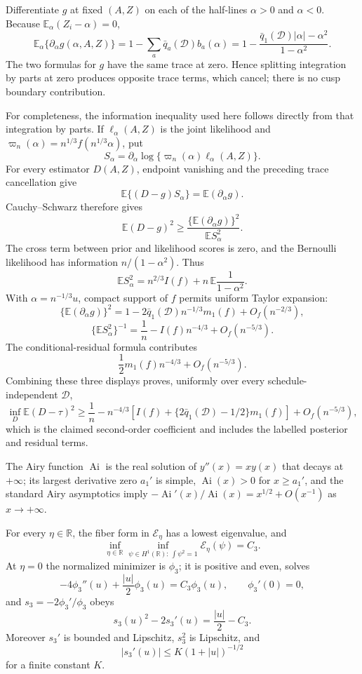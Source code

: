 Differentiate \(g\) at fixed \((A,Z)\) on each of the half-lines \(\alpha>0\) and \(\alpha<0\).  Because \(\mathbb E_\alpha(Z_i-\alpha)=0\),
\[
\mathbb E_\alpha\{\partial_\alpha g(\alpha,A,Z)\}
=1-\sum_a\bar q_a(\mathcal D)b_a(\alpha)
=1-\frac{\bar q_1(\mathcal D)|\alpha|-\alpha^2}{1-\alpha^2}.
\]
The two formulas for \(g\) have the same trace at zero.  Hence splitting integration by parts at zero produces opposite trace terms, which cancel; there is no cusp boundary contribution.

For completeness, the information inequality used here follows directly from that integration by parts.  If \(\ell_\alpha(A,Z)\) is the joint likelihood and \(\varpi_n(\alpha)=n^{1/3}f(n^{1/3}\alpha)\), put
\[
S_\alpha=\partial_\alpha\log\{\varpi_n(\alpha)\ell_\alpha(A,Z)\}.
\]
For every estimator \(D(A,Z)\), endpoint vanishing and the preceding trace cancellation give
\[
\mathbb E\{(D-g)S_\alpha\}=\mathbb E(\partial_\alpha g).
\]
Cauchy--Schwarz therefore gives
\[
\mathbb E(D-g)^2\geq
\frac{\{\mathbb E(\partial_\alpha g)\}^2}{\mathbb E S_\alpha^2}.
\]
The cross term between prior and likelihood scores is zero, and the Bernoulli likelihood has information \(n/(1-\alpha^2)\).  Thus
\[
\mathbb E S_\alpha^2
=n^{2/3}I(f)+n\,\mathbb E\frac1{1-\alpha^2}.
\]
With \(\alpha=n^{-1/3}u\), compact support of \(f\) permits uniform Taylor expansion:
\[
\{\mathbb E(\partial_\alpha g)\}^2
=1-2\bar q_1(\mathcal D)n^{-1/3}m_1(f)+O_f(n^{-2/3}),
\]
\[
\{\mathbb E S_\alpha^2\}^{-1}
=\frac1n-I(f)n^{-4/3}+O_f(n^{-5/3}).
\]
The conditional-residual formula contributes
\[
\frac12m_1(f)n^{-4/3}+O_f(n^{-5/3}).
\]
Combining these three displays proves, uniformly over every schedule-independent \(\mathcal D\),
\[
\inf_D\mathbb E(D-\tau)^2
\geq \frac1n-n^{-4/3}
\left[I(f)+\{2\bar q_1(\mathcal D)-1/2\}m_1(f)\right]
+O_f(n^{-5/3}),
\]
which is the claimed second-order coefficient and includes the labelled posterior and residual terms.

The Airy function \(\operatorname{Ai}\) is the real solution of \(y''(x)=xy(x)\) that decays at \(+\infty\); its largest derivative zero \(a_1'\) is simple, \(\operatorname{Ai}(x)>0\) for \(x\geq a_1'\), and the standard Airy asymptotics imply \(-\operatorname{Ai}'(x)/\operatorname{Ai}(x)=x^{1/2}+O(x^{-1})\) as \(x\to+\infty\).

For every \(\eta\in\mathbb R\), the fiber form in \(\mathcal E_\eta\) has a lowest eigenvalue, and
\[
\inf_{\eta\in\mathbb R}\inf_{\psi\in H^1(\mathbb R):\,\int\psi^2=1}
\mathcal E_\eta(\psi)=C_3.
\]
At \(\eta=0\) the normalized minimizer is \(\phi_3\); it is positive and even, solves
\[
-4\phi_3''(u)+\frac{|u|}{2}\phi_3(u)=C_3\phi_3(u),
\qquad \phi_3'(0)=0,
\]
and \(s_3=-2\phi_3'/\phi_3\) obeys
\[
s_3(u)^2-2s_3'(u)=\frac{|u|}{2}-C_3.
\]
Moreover \(s_3'\) is bounded and Lipschitz, \(s_3^2\) is Lipschitz, and
\[
|s_3'(u)|\leq K(1+|u|)^{-1/2}
\]
for a finite constant \(K\).

